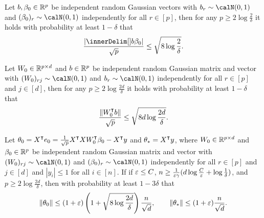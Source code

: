 \begin{lemma}\label{lem:inner-product-tail}
    Let $b,\beta_0\in{\mathbb{R}^{p}}$ be independent random Gaussian vectors with $b_r\sim\calN(0,1)$ and $(\beta_0)_r\sim\calN(0,1)$ independently for all $r\in[p]$, then for any $p \geq 2\log\frac{2}{\delta}$ it holds with probability at least $1-\delta$ that
    \begin{align*}
        \frac{|\inner{b}{\beta_0}|}{\sqrt{p}} \leq \sqrt{8\log\frac{2}{\delta}}.
    \end{align*}
\end{lemma}

\begin{corollary}\label{cor:W0-b-tail}
    Let $W_0\in{\mathbb{R}^{p\times d}}$ and $b\in{\mathbb{R}^{p}}$ be independent random Gaussian matrix and vector with $(W_0)_{rj}\sim\calN(0,1)$ and $b_r\sim\calN(0,1)$ independently for all $r\in[p]$ and $j\in[d]$, then for any $p \geq 2\log\frac{2d}{\delta}$ it holds with probability at least $1-\delta$ that
    \begin{align*}
        \frac{\|W_0\transpose b\|}{\sqrt{p}} \leq \sqrt{8d\log\frac{2d}{\delta}}.
    \end{align*}
\end{corollary}

\begin{corollary}\label{cor:theta-tail}
    Let $\theta_0 = X\transpose e_0 = \frac{1}{\sqrt{p}}X\transpose X W_0\transpose\beta_0 - X\transpose y$ and $\theta_* = X\transpose y$, where $W_0\in{\mathbb{R}^{p\times d}}$ and $\beta_0\in{\mathbb{R}^{p}}$ be independent random Gaussian matrix and vector with $(W_0)_{rj}\sim\calN(0,1)$ and $(\beta_0)_r\sim\calN(0,1)$ independently for all $r\in[p]$ and $j\in[d]$ and $|y_i|\leq 1$ for all $i\in[n]$. If if $\varepsilon \leq C$, $n \geq \frac{1}{\varepsilon\gamma} (d\log\frac{C}{\varepsilon} + \log\frac{1}{\delta})$, and $p \geq 2\log\frac{2d}{\delta}$, then with probability at least $1-3\delta$ that
    \begin{align*}
        \|\theta_0\|\leq (1+\varepsilon)\left(1 + \sqrt{8\log\frac{2d}{\delta}}\right)\frac{n}{\sqrt{d}}, \qquad \|\theta_*\|\leq (1+\varepsilon)\frac{n}{\sqrt{d}}.
    \end{align*}
\end{corollary}

